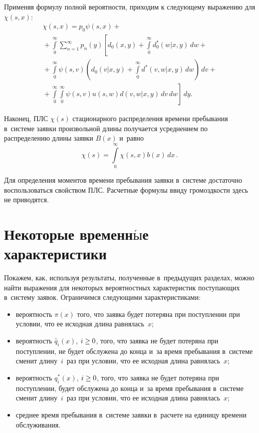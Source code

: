 \begin{multicols}{2}
Применяя формулу полной вероятности, приходим к следующему выражению для $\chi(s,x)$:
\begin{multline*}
\chi(s,x)= p_0\psi(s,x)+{}\\
{}+
\int\limits_0^\infty\sum\limits_{n=1}^\infty p_n(y) \left [
d_0(x,y)+\int\limits_0^\infty d_0^*(w|x,y)\,dw
+{}\right.
\\
{}+
\int\limits_0^\infty\! \psi(s,v)
\left ( d_0(v|x,y)+\int\limits_0^\infty\! d^*(v,w|x,y)\,dw \right) \,dv
+{}
\\
{}+
\left.\int\limits_0^\infty\!
\int\limits_0^\infty\! \psi(s,v)u(s,w)d(v,w|x,y) \,dv  \, dw
\right] \,dy.
\end{multline*}

Наконец, ПЛС $\chi(s)$ стационарного распределения времени пребывания в~системе заявки произвольной длины получается усреднением по распределению длины заявки $B(x)$ и~равно
$$
\chi(s)=\int\limits_0^\infty\chi(s,x)b(x)\,dx\,.
$$

Для определения моментов времени пребывания заявки в~системе достаточно воспользоваться свойством ПЛС. Расчетные формулы ввиду громоздкости здесь не приводятся.

\section{Некоторые временн$\acute{\mbox{ы}}$е характеристики}

Покажем, как, используя  результаты,
полученные в~предыду\-щих разделах,
можно найти выражения для некоторых вероятностных характеристик
поступающих в~систему заявок.
Ограничимся следующими характеристиками:
\begin{itemize}
\item вероятность $\pi(x)$ того, что заявка будет потеряна при поступлении при условии, что ее исходная длина равнялась~$x$;
\item вероятность ${\widehat{q}_i(x)}$, $i\hm\ge 0$, того, что заявка не будет потеряна при поступлении, не будет
обслужена до конца и~за время пребывания в~сис\-те\-ме сменит длину~$i$~раз при условии, что ее исходная длина равнялась~$x$;
\item вероятность $q_i^*(x)$, $i\hm\ge 0$, того, что заявка не будет потеряна при поступлении, будет обслужена до конца и~за время пребывания в~системе сменит длину~$i$~раз при условии, что ее исходная длина равнялась~$x$;
\item среднее время пребывания в~системе заявки в~расчете на единицу времени обслуживания.
\end{itemize}


\end{multicols}
